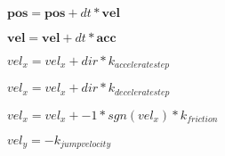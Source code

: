 \documentclass[multi={mymath},border=1pt]{standalone}
\newenvironment{mymath}{$\displaystyle}{$}
\renewcommand{\vec}[1]{\mathbf{#1}}
\begin{document}
\begin{mymath}
      \vec{pos} = \vec{pos} + dt * \vec{vel}
\end{mymath}

\begin{mymath}
      \vec{vel} = \vec{vel} + dt * \vec{acc}
\end{mymath}

\begin{mymath}
      vel_{x} = vel_{x} + dir * k_{accelerate step}
\end{mymath}

\begin{mymath}
      vel_{x} = vel_{x} + dir * k_{decelerate step}
\end{mymath}

\begin{mymath}
      vel_{x} = vel_{x} + -1 * sgn(vel_{x}) * k_{friction}
\end{mymath}

\begin{mymath}
      vel_{y} = -k_{jump velocity}
\end{mymath}
\end{document}
